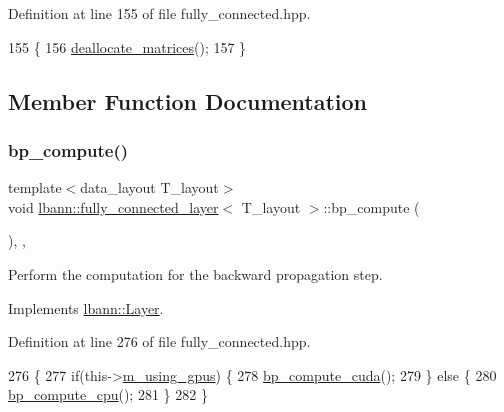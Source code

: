 Definition at line 155 of file fully\+\_\+connected.\+hpp.


\begin{DoxyCode}
155                                     \{
156     \hyperlink{classlbann_1_1fully__connected__layer_a91f359a41cfbab6f21bd67bccb8409b1}{deallocate\_matrices}();
157   \}
\end{DoxyCode}


\subsection{Member Function Documentation}
\mbox{\label{classlbann_1_1fully__connected__layer_a8cc9a10e336f61ef54d5e3f4a9ffdfb8}} 
\subsubsection{\texorpdfstring{bp\+\_\+compute()}{bp\_compute()}}
{\footnotesize\ttfamily template$<$data\+\_\+layout T\+\_\+layout$>$ \\
void \hyperlink{classlbann_1_1fully__connected__layer}{lbann\+::fully\+\_\+connected\+\_\+layer}$<$ T\+\_\+layout $>$\+::bp\+\_\+compute (\begin{DoxyParamCaption}{ }\end{DoxyParamCaption})\hspace{0.3cm}{\ttfamily [inline]}, {\ttfamily [override]}, {\ttfamily [virtual]}}

Perform the computation for the backward propagation step. 

Implements \hyperlink{classlbann_1_1Layer_a7442e01f9ee1294df2de811efcf5171e}{lbann\+::\+Layer}.



Definition at line 276 of file fully\+\_\+connected.\+hpp.


\begin{DoxyCode}
276                              \{
277     \textcolor{keywordflow}{if}(this->\hyperlink{classlbann_1_1Layer_af7881cb5eff5207c15fa835d65462e8f}{m\_using\_gpus}) \{
278       \hyperlink{classlbann_1_1fully__connected__layer_a521aa4a5b88ef00f554fe21a850f6596}{bp\_compute\_cuda}();
279     \} \textcolor{keywordflow}{else} \{
280       \hyperlink{classlbann_1_1fully__connected__layer_affbaa1ecb08e45ff6f9ab195227d0084}{bp\_compute\_cpu}();
281     \}
282   \}
\end{DoxyCode}
\mbox{\label{classlbann_1_1fully__connected__layer_a4c5b0eea2036c41b15ec03594dac8dc2}} 
